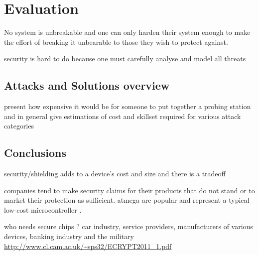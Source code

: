 \section{Evaluation}
\label{sec:conclusion}

No system is unbreakable and one can only harden their system enough to make the effort of breaking it unbearable to those they wish to protect against\citep{anderson:cautionary_note}\cite{sergei:thesis}.

security is hard to do because one must carefully analyse and model all threats \citep{kocher:DPA}
	\subsection{Attacks and Solutions overview}
	present how expensive it would be for someone to put together a probing station and in general give estimations of cost  and skillset required for various attack categories
	\subsection{Conclusions}

security/shielding adds to a device's cost and size \citep{kocher:DPA} and there is a tradeoff \citep{sergei:thesis}


companies tend to make security claims for their products that do not stand or to market their protection as sufficient\citep{sergei:thesis}. atmega are popular and represent a typical low-cost microcontroller \citep{glitches_paper}. 

who needs secure chips ? car industry, service providers, manufacturers of various devices, banking industry and the military \url{http://www.cl.cam.ac.uk/~sps32/ECRYPT2011_1.pdf}

